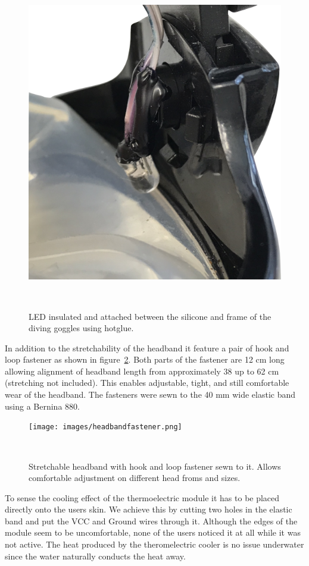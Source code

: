\begin{figure}
	\includegraphics[width= \textwidth]{images/LEDcloseupcut.png}
	\caption{LED insulated and attached between the silicone and frame of the diving goggles using hotglue. }~\label{fig:ledcloseup}
\end{figure}

In addition to the stretchability of the headband it feature a pair of hook and loop fastener as shown in figure~\ref{fig:headbandfastener}.
Both parts of the fastener are 12 cm long allowing alignment of headband length from approximately 38 up to 62 cm (stretching not included).
This enables adjustable, tight, and still comfortable wear of the headband.
The fasteners were sewn to the 40 mm wide elastic band using a Bernina 880.

\begin{figure}
	\texttt{[image: images/headbandfastener.png]}
	\caption{Stretchable headband with hook and loop fastener sewn to it. Allows comfortable adjustment on different head froms and sizes.}~\label{fig:headbandfastener}
\end{figure}

To sense the cooling effect of the thermoelectric module it has to be placed directly onto the users skin.
We achieve this by cutting two holes in the elastic band and put the VCC and Ground wires through it. 
Although the edges of the module seem to be uncomfortable, none of the users noticed it at all while it was not active.
The heat produced by the theromelectric cooler is no issue underwater since the water naturally conducts the heat away.

